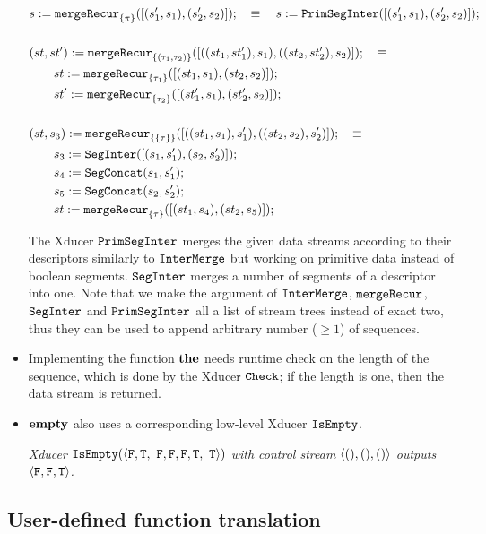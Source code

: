 \begin{itemize}
\begin{align*}
& s := \mergeRecur{\{\pi\}}([(s_1',s_1),(s_2',s_2)]); \quad \equiv  \quad s := \primseginter([(s'_1,s_1), (s_2',s_2)]); \\
\\
&(st,st')  := \mergeRecur{\{(\tau_1,\tau_2)\}}([((st_1,st_1'),s_1),((st_2,st_2'),s_2)]); \quad \equiv \\ 
& \qquad st := \mergeRecur{\{\tau_1\}}([(st_1,s_1),(st_2,s_2)]); \\ 
& \qquad st' := \mergeRecur{\{\tau_2\}}([(st_1',s_1),(st_2',s_2)]);\\
\\
& (st,s_3)  := \mergeRecur{\{\{\tau\}\}}([((st_1,s_1),s_1'),((st_2,s_2),s_2')]); \quad \equiv \\
& \qquad s_3 := \seginter([(s_1,s_1'),(s_2,s_2')]); \\ 
& \qquad s_4 := \segconcat(s_1,s_1'); \\ 
& \qquad s_5 := \segconcat(s_2,s_2'); \\ 
&\qquad st := \mergeRecur{\{\tau\}}([(st_1,s_4),(st_2,s_5)]);
\end{align*}

The Xducer $\primseginter$ merges the given data streams according to their descriptors similarly to $\intermerge$ but working on primitive data instead of boolean segments.
$\seginter$ merges a number of segments of a descriptor into one.
Note that we make the argument of $\intermerge$, $\mergeRecur{}$, $\seginter$ and $\primseginter$  all a list of stream trees instead of exact two, thus they can be used to append arbitrary number ($\ge 1$) of sequences.

\item Implementing the function $\*{the}$ needs runtime check on the length of the sequence, which is done by the Xducer $\check$; if the length is one, then the data stream is returned.


\item $\*{empty}$ also uses a corresponding low-level Xducer $\isempty$.
\begin{example}
	\emph{Xducer $\isempty(\<\F,\T, \ \F, \F,\F, \T,\  \T\'>)$ with control stream $\< (),(),()\'>$ outputs $\<\F,\F,\T\'>$.}		
\end{example}


\end{itemize}



\subsection{User-defined function translation}


